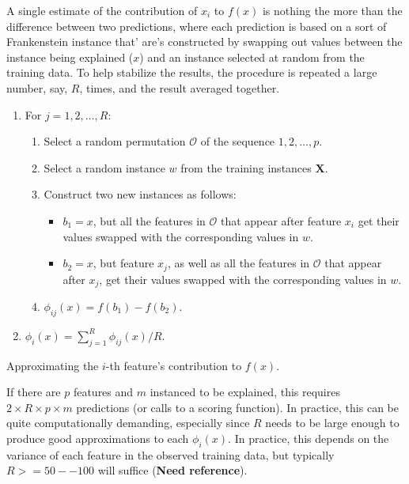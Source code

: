 A single estimate of the contribution of \(x_i\) to \(f\left(x\right)\)
is nothing the more than the difference between two predictions, where
each prediction is based on a sort of Frankenstein instance that' are's
constructed by swapping out values between the instance being explained
(\(x\)) and an instance selected at random from the training data. To
help stabilize the results, the procedure is repeated a large number,
say, \(R\), times, and the result averaged together.

\begin{algorithm}
\begin{enumerate}
  \item For $j = 1, 2, \dots, R$:
  \begin{enumerate}
    \item Select a random permutation $\mathcal{O}$ of the sequence $1, 2, \dots, p$.
    \item Select a random instance $w$ from the training instances $\boldsymbol{X}$.
    \item Construct two new instances as follows:
    \begin{itemize}
      \item $b_1 = x$, but all the features in $\mathcal{O}$ that appear after feature $x_i$ get their values swapped with the corresponding values in $w$.
      \item $b_2 = x$, but feature $x_j$, as well as all the features in $\mathcal{O}$ that appear after $x_j$, get their values swapped with the corresponding values in $w$.
    \end{itemize}
    \item $\phi_{ij}\left(x\right) = f\left(b_1\right) - f\left(b_2\right)$.
  \end{enumerate}
  \item $\phi_i\left(x\right) = \sum_{j = 1} ^ R \phi_{ij}\left(x\right) / R$.
\end{enumerate}
\caption{Approximating the $i$-th feature's contribution to $f\left(x\right)$. \label{alg:SampleSHAP}}
\end{algorithm}

If there are \(p\) features and \(m\) instanced to be explained, this
requires \(2 \times R \times p \times m\) predictions (or calls to a
scoring function). In practice, this can be quite computationally
demanding, especially since \(R\) needs to be large enough to produce
good approximations to each \(\phi_i\left(x\right)\). In practice, this
depends on the variance of each feature in the observed training data,
but typically \(R >= 50--100\) will suffice (\textbf{Need reference}).


